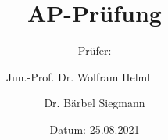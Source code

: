 

\subject{Gedächtnisprotokoll}
\title{AP-Prüfung}
\date{%
  Datum: 25.08.2021
}
\author{%
  Prüfer:
  \and
  Jun.-Prof. Dr. Wolfram Helml~~~~~~%
  \and
  Dr. Bärbel Siegmann%
}
\publishers{TU Dortmund – Fakultät Physik}



\maketitle
\thispagestyle{empty}



\printbibliography{}



